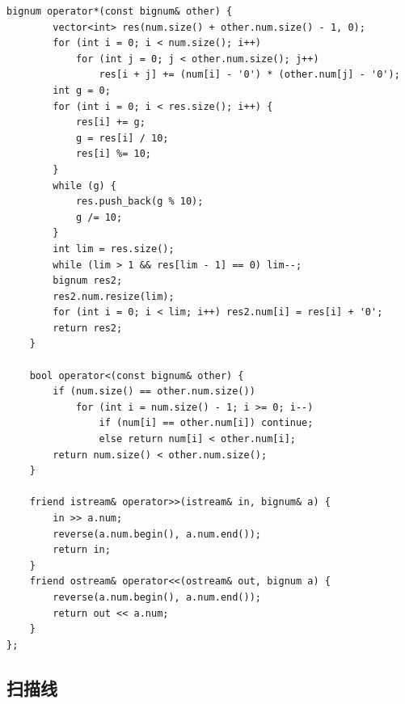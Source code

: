 \documentclass[UTF8]{ctexart}
\begin{document}
\begin{sloppypar}
\begin{lstlisting}[style=cpp]
    bignum operator*(const bignum& other) {
        vector<int> res(num.size() + other.num.size() - 1, 0);
        for (int i = 0; i < num.size(); i++)
            for (int j = 0; j < other.num.size(); j++)
                res[i + j] += (num[i] - '0') * (other.num[j] - '0');
        int g = 0;
        for (int i = 0; i < res.size(); i++) {
            res[i] += g;
            g = res[i] / 10;
            res[i] %= 10;
        }
        while (g) {
            res.push_back(g % 10);
            g /= 10;
        }
        int lim = res.size();
        while (lim > 1 && res[lim - 1] == 0) lim--;
        bignum res2;
        res2.num.resize(lim);
        for (int i = 0; i < lim; i++) res2.num[i] = res[i] + '0';
        return res2;
    }

    bool operator<(const bignum& other) {
        if (num.size() == other.num.size())
            for (int i = num.size() - 1; i >= 0; i--)
                if (num[i] == other.num[i]) continue;
                else return num[i] < other.num[i];
        return num.size() < other.num.size();
    }

    friend istream& operator>>(istream& in, bignum& a) {
        in >> a.num;
        reverse(a.num.begin(), a.num.end());
        return in;
    }
    friend ostream& operator<<(ostream& out, bignum a) {
        reverse(a.num.begin(), a.num.end());
        return out << a.num;
    }
};
\end{lstlisting}

\subsection{扫描线}


\end{sloppypar}
\end{document}

